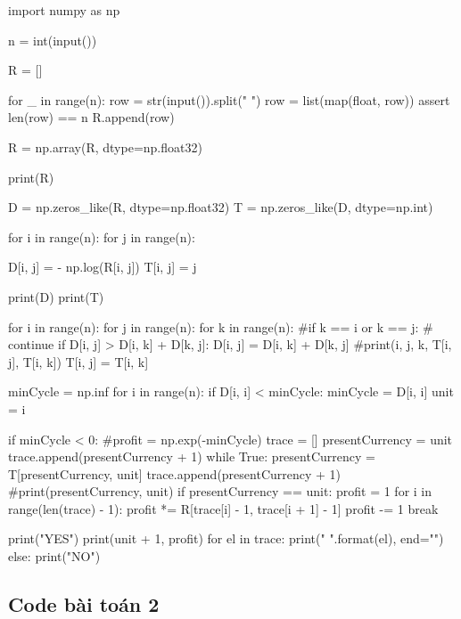 \documentclass[14pt, a4paper]{article}
\theoremstyle{sltheorem}
\theoremstyle{soltheorem}
\begin{document}
\begin{python}
import numpy as np
    
    
n = int(input())
                
R = []
                
for _ in range(n):
    row = str(input()).split(" ")
    row = list(map(float, row))
    assert len(row) == n
    R.append(row)
                
R = np.array(R, dtype=np.float32)
                
print(R)
                
D = np.zeros_like(R, dtype=np.float32)
T = np.zeros_like(D, dtype=np.int)
                
for i in range(n):
    for j in range(n):
            
        D[i, j] = - np.log(R[i, j])
        T[i, j] = j
                        
                
print(D)
print(T)
                
                
                
for i in range(n):
    for j in range(n):
        for k in range(n):        
            #if k == i or k == j:
            #    continue
            if D[i, j] > D[i, k] + D[k, j]:
                D[i, j] = D[i, k] + D[k, j]
                #print(i, j, k, T[i, j], T[i, k])
                T[i, j] = T[i, k]
            
minCycle = np.inf
for i in range(n):
    if D[i, i] < minCycle:
        minCycle = D[i, i]
        unit = i
                
if minCycle < 0:
    #profit = np.exp(-minCycle)
    trace = []
    presentCurrency = unit
    trace.append(presentCurrency + 1)
    while True:
        presentCurrency = T[presentCurrency, unit]
        trace.append(presentCurrency + 1)
        #print(presentCurrency, unit)
        if presentCurrency == unit:
            profit = 1
            for i in range(len(trace) - 1):
                profit *= R[trace[i] - 1, trace[i + 1] - 1]
            profit -= 1
            break
            
            print("YES")
            print(unit + 1, profit)
            for el in trace:
                print("{} ".format(el), end="")
        else:
            print("NO")
\end{python}

\subsection{Code bài toán 2} \label{code-2-ex-3}
\end{document}
